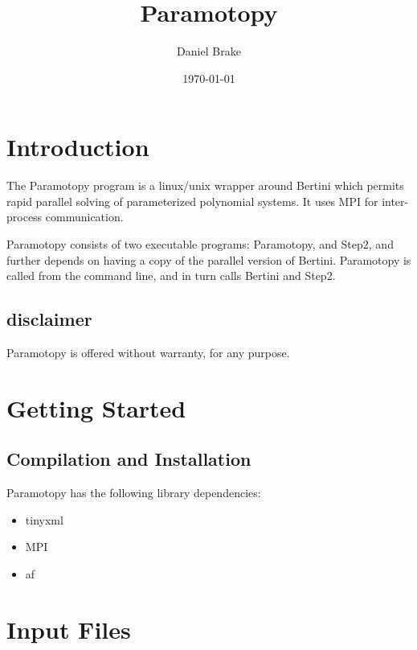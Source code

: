 \documentclass[10pt]{article}
\title{Paramotopy}
\author{Daniel Brake}
\date{\today}
\newcommand{\singlespace}[1]{{\setlength{\baselineskip}{0.6\baselineskip} {#1} \par}}
\begin{document}
\pagestyle{plain} 
\setcounter{page}{1}


\thispagestyle{empty}
\maketitle

\newpage


\singlespace{
\tableofcontents

}
\eject
{} 
\setcounter{page}{1}
\eject




\section{Introduction}

The Paramotopy program is a linux/unix wrapper around Bertini which permits rapid parallel solving of parameterized polynomial systems.  It uses MPI for inter-process communication.

Paramotopy consists of two executable programs: Paramotopy, and Step2, and further depends on having a copy of the parallel version of Bertini.  Paramotopy is called from the command line, and in turn calls Bertini and Step2.

\subsection*{disclaimer}
Paramotopy is offered without warranty, for any purpose. 

\section{Getting Started}


\subsection{Compilation and Installation}

Paramotopy has the following library dependencies: 
\singlespace{
\begin{itemize}
\item tinyxml
\item MPI
\item af
\end{itemize}
}

\section{Input Files}
\end{document}
